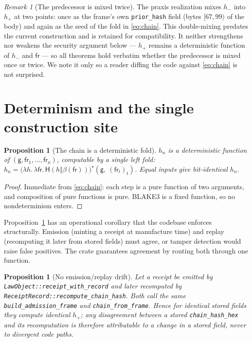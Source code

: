 \documentclass[11pt,oneside]{book}
\theoremstyle{definition}
\theoremstyle{plain}
\newtheorem{proposition}[theorem]{Proposition}
\theoremstyle{remark}
\newtheorem*{remark}{Remark}
\newcommand{\chainH}{\mathsf{H}}               %
\newcommand{\fr}{\mathsf{fr}}                   %
\newcommand{\body}{\beta}                       %
\newcommand{\code}[1]{\texttt{#1}}
\newcommand{\concat}{\mathbin{\Vert}}           %
\newcommand{\Genesis}{\mathsf{g}}               %
\begin{document}
\begin{remark}[The predecessor is mixed twice]
The praxis realization mixes $h_{-}$ into $h_{+}$ at two points: once as the frame's own
\code{prior\_hash} field (bytes $[67,99)$ of the body) and again as the seed of the fold in
\eqref{eq:chain}. %
This double-mixing predates the current construction and is retained for
compatibility. %
It neither strengthens nor weakens the security argument below --- $h_{+}$
remains a deterministic function of $h_{-}$ and $\fr$ --- so all theorems hold verbatim
whether the predecessor is mixed once or twice. %
We note it only so a reader diffing the code
against \eqref{eq:chain} is not surprised. %
\end{remark}

\section{Determinism and the single construction site}

\begin{proposition}[The chain is a deterministic fold]\label{prop:fold}
$h_n$ is a deterministic function of $(\Genesis,\fr_1,\dots,\fr_n)$, computable by a single
left fold: $h_n=\bigl(\lambda h.\,\lambda \fr.\,\chainH(h\concat\body(\fr))\bigr)^{\!\star}
(\Genesis,\ (\fr_t)_t)$. Equal inputs give bit-identical $h_n$. %
\end{proposition}

\begin{proof}
Immediate from \eqref{eq:chain}: each step is a pure function of two arguments, and
composition of pure functions is pure. %
BLAKE3 is a fixed function, so no nondeterminism
enters. %
 \end{proof}

Proposition~\ref{prop:fold} has an operational corollary that the codebase enforces
structurally. %
Emission (minting a receipt at manufacture time) and replay (recomputing it
later from stored fields) must agree, or tamper detection would raise false positives. %
The
crate guarantees agreement by routing both through one function. %

\begin{proposition}[No emission/replay drift]\label{prop:nodrift}
Let a receipt be emitted by \code{LawObject::receipt\_with\_record} and later recomputed by
\code{ReceiptRecord::recompute\_chain\_hash}. %
Both call the same \code{build\_admission\_frame}
and \code{chain\_from\_frame}. %
Hence for identical stored fields they compute identical
$h_{+}$; any disagreement between a stored \code{chain\_hash\_hex} and its recomputation is
therefore attributable to a change in a stored field, never to divergent code paths. %
\end{proposition}
\end{document}
